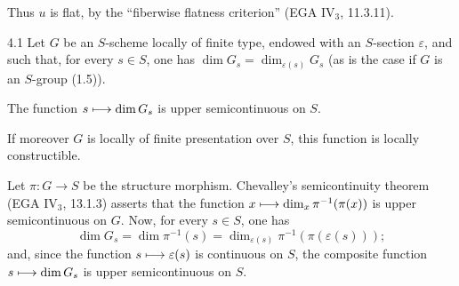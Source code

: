 Thus $u$ is flat, by the ``fiberwise flatness criterion'' (EGA IV$_3$, 11.3.11).

\begin{proposition}{4.1}\label{VIB.4.1}
Let $G$ be an $S$-scheme locally of finite type, endowed with an $S$-section $\varepsilon$, and such that, for every $s\in S$, one has $\dim G_s=\dim_{\varepsilon(s)}G_s$ (as is the case if $G$ is an $S$-group (1.5)).
\begin{enumeratei}
\item The function $s\longmapsto\dim G_s$ is upper semicontinuous on $S$.
\item If moreover $G$ is locally of finite presentation over $S$, this function is locally constructible.
\end{enumeratei}
\end{proposition}
Let $\pi:G\to S$ be the structure morphism. Chevalley's semicontinuity theorem (EGA IV$_3$, 13.1.3) asserts that the function $x\longmapsto\dim_x\pi^{-1}(\pi(x))$ is upper semicontinuous on $G$. Now, for every $s\in S$, one has
\[
\dim G_s=\dim\pi^{-1}(s)=\dim_{\varepsilon(s)}\pi^{-1}(\pi(\varepsilon(s)));
\]
and, since the function $s\longmapsto\varepsilon(s)$ is continuous on $S$, the composite function $s\longmapsto\dim G_s$ is upper semicontinuous on $S$.


